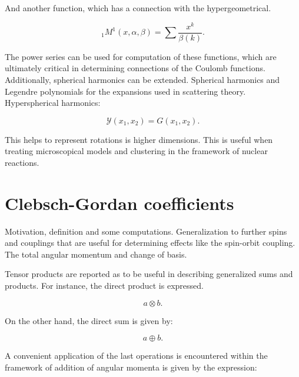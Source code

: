 \documentclass[openany]{book}
\begin{document}
And another function, which has a connection with the hypergeometrical.

\begin{equation}\label{eq:selected_hyper_additional}
	{}_{1}M^{1}(x, \alpha, \beta) = \sum {\frac{x^k}{\beta(k)}}.
\end{equation}

The power series can be used for computation of these functions, which are ultimately critical in determining connections of the Coulomb functions. \\

Additionally, spherical harmonics can be extended.
Spherical harmonics and Legendre polynomials for the expansions used in scattering theory.  Hyperspherical harmonics:

\begin{equation}\label{eq:selected_hyperSphericalHarmonic}
	\mathcal{Y}(x_1, x_2) = G(x_1, x_2). 
\end{equation}

This helps to represent rotations is higher dimensions. This is useful when treating microscopical models and clustering in the framework of nuclear reactions. 

\section{Clebsch-Gordan coefficients} \label{sec:clebschGordan}

Motivation, definition and some computations. Generalization to further spins and couplings that are useful for determining effects like the spin-orbit coupling. \\

The total angular momentum and change of basis.

Tensor products are reported as to be useful in describing generalized sums and products. For instance, the direct product is expressed.

\begin{equation} \label{eq:angularMomentum_tensorSum}
	a \otimes b.
\end{equation}

On the other hand, the direct sum is given by:

\begin{equation} \label{eq:angularMomentum_tensorProduct}
	a \oplus b.
\end{equation}

A convenient application of the last operations is encountered  within the framework of addition of angular momenta is given by the expression: 
\end{document}
